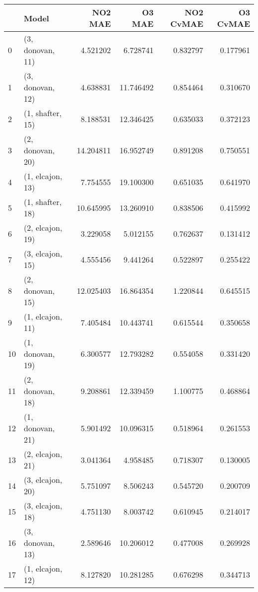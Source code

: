 \begin{tabular}{llrrrr}
\toprule
{} &             Model &    NO2 MAE &     O3 MAE &  NO2 CvMAE &  O3 CvMAE \\
\midrule
0  &  (3, donovan, 11) &   4.521202 &   6.728741 &   0.832797 &  0.177961 \\
1  &  (3, donovan, 12) &   4.638831 &  11.746492 &   0.854464 &  0.310670 \\
2  &  (1, shafter, 15) &   8.188531 &  12.346425 &   0.635033 &  0.372123 \\
3  &  (2, donovan, 20) &  14.204811 &  16.952749 &   0.891208 &  0.750551 \\
4  &  (1, elcajon, 13) &   7.754555 &  19.100300 &   0.651035 &  0.641970 \\
5  &  (1, shafter, 18) &  10.645995 &  13.260910 &   0.838506 &  0.415992 \\
6  &  (2, elcajon, 19) &   3.229058 &   5.012155 &   0.762637 &  0.131412 \\
7  &  (3, elcajon, 15) &   4.555456 &   9.441264 &   0.522897 &  0.255422 \\
8  &  (2, donovan, 15) &  12.025403 &  16.864354 &   1.220844 &  0.645515 \\
9  &  (1, elcajon, 11) &   7.405484 &  10.443741 &   0.615544 &  0.350658 \\
10 &  (1, donovan, 19) &   6.300577 &  12.793282 &   0.554058 &  0.331420 \\
11 &  (2, donovan, 18) &   9.208861 &  12.339459 &   1.100775 &  0.468864 \\
12 &  (1, donovan, 21) &   5.901492 &  10.096315 &   0.518964 &  0.261553 \\
13 &  (2, elcajon, 21) &   3.041364 &   4.958485 &   0.718307 &  0.130005 \\
14 &  (3, elcajon, 20) &   5.751097 &   8.506243 &   0.545720 &  0.200709 \\
15 &  (3, elcajon, 18) &   4.751130 &   8.003742 &   0.610945 &  0.214017 \\
16 &  (3, donovan, 13) &   2.589646 &  10.206012 &   0.477008 &  0.269928 \\
17 &  (1, elcajon, 12) &   8.127820 &  10.281285 &   0.676298 &  0.344713 \\
\bottomrule
\end{tabular}
